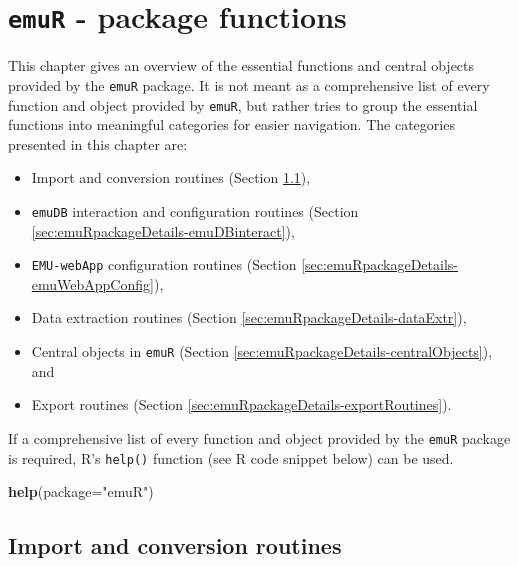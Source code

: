 \documentclass[]{book}
\newenvironment{Shaded}{\begin{snugshade}}{\end{snugshade}}
\newcommand{\DataTypeTok}[1]{\textcolor[rgb]{0.13,0.29,0.53}{#1}}
\newcommand{\KeywordTok}[1]{\textcolor[rgb]{0.13,0.29,0.53}{\textbf{#1}}}
\newcommand{\NormalTok}[1]{#1}
\newcommand{\StringTok}[1]{\textcolor[rgb]{0.31,0.60,0.02}{#1}}
\providecommand{\tightlist}{%
  \setlength{\itemsep}{0pt}\setlength{\parskip}{0pt}}
\begin{document}
\hypertarget{chap:emuRpackageDetails}{%
\chapter{\texorpdfstring{\texttt{emuR} - package functions}{emuR - package functions}}\label{chap:emuRpackageDetails}}

This chapter gives an overview of the essential functions and central objects provided by the \texttt{emuR} package. It is not meant as a comprehensive list of every function and object provided by \texttt{emuR}, but rather tries to group the essential functions into meaningful categories for easier navigation. The categories presented in this chapter are:

\begin{itemize}
\tightlist
\item
  Import and conversion routines (Section \ref{sec:emuRpackageDetails-importRoutines}),
\item
  \texttt{emuDB} interaction and configuration routines (Section \ref{sec:emuRpackageDetails-emuDBinteract}),
\item
  \texttt{EMU-webApp} configuration routines (Section \ref{sec:emuRpackageDetails-emuWebAppConfig}),
\item
  Data extraction routines (Section \ref{sec:emuRpackageDetails-dataExtr}),
\item
  Central objects in \texttt{emuR} (Section \ref{sec:emuRpackageDetails-centralObjects}), and
\item
  Export routines (Section \ref{sec:emuRpackageDetails-exportRoutines}).
\end{itemize}

If a comprehensive list of every function and object provided by the \texttt{emuR} package is required, R's \texttt{help()} function (see R code snippet below) can be used.

\begin{Shaded}
\begin{Highlighting}[]
\KeywordTok{help}\NormalTok{(}\DataTypeTok{package=}\StringTok{"emuR"}\NormalTok{)}
\end{Highlighting}
\end{Shaded}

\hypertarget{sec:emuRpackageDetails-importRoutines}{%
\section{Import and conversion routines}\label{sec:emuRpackageDetails-importRoutines}}
\end{document}
